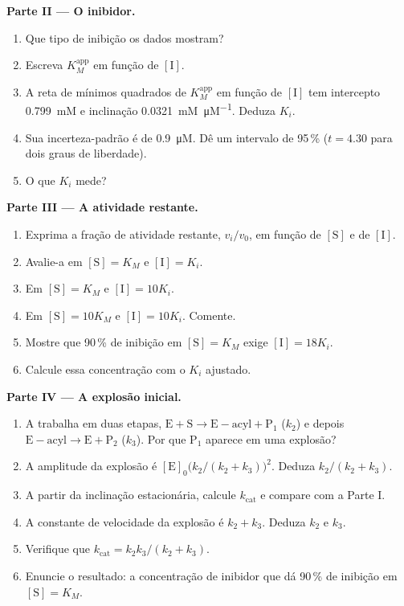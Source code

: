 \begin{problem}
\medskip\noindent\textbf{Parte II --- O inibidor.}
\begin{enumerate}[resume]
  \item Que tipo de inibição os dados mostram?
  \item Escreva $K_M^{\mathrm{app}}$ em função de $[\mathrm I]$.
  \item A reta de mínimos quadrados de $K_M^{\mathrm{app}}$ em função de $[\mathrm I]$ tem intercepto \qty{0.799}{mM} e
        inclinação \qty{0.0321}{mM.\micro M^{-1}}. Deduza $K_i$.
  \item Sua incerteza-padrão é de \qty{0.9}{\micro M}. Dê um intervalo de 95\,\% ($t = 4.30$ para
        dois graus de liberdade).
  \item O que $K_i$ mede?
\end{enumerate}

\medskip\noindent\textbf{Parte III --- A atividade restante.}
\begin{enumerate}[resume]
  \item Exprima a fração de atividade restante, $v_i/v_0$, em função de $[\mathrm S]$ e de
        $[\mathrm I]$.
  \item Avalie-a em $[\mathrm S] = K_M$ e $[\mathrm I] = K_i$.
  \item Em $[\mathrm S] = K_M$ e $[\mathrm I] = 10K_i$.
  \item Em $[\mathrm S] = 10K_M$ e $[\mathrm I] = 10K_i$. Comente.
  \item Mostre que 90\,\% de inibição em $[\mathrm S] = K_M$ exige $[\mathrm I] = 18K_i$.
  \item Calcule essa concentração com o $K_i$ ajustado.
\end{enumerate}

\medskip\noindent\textbf{Parte IV --- A explosão inicial.}
\begin{enumerate}[resume]
  \item A  trabalha em duas etapas, $\mathrm{E + S \to E{-}acyl + P_1}$ ($k_2$) e depois $\mathrm{E{-}acyl \to E +
        P_2}$ ($k_3$). Por que $\mathrm P_1$ aparece em uma explosão?
  \item A amplitude da explosão é $[\mathrm E]_0\bigl(k_2/(k_2 + k_3)\bigr)^2$. Deduza $k_2/(k_2 + k_3)$.
  \item A partir da inclinação estacionária, calcule $k_{\mathrm{cat}}$ e compare com a Parte I.
  \item A constante de velocidade da explosão é $k_2 + k_3$. Deduza $k_2$ e $k_3$.
  \item Verifique que $k_{\mathrm{cat}} = k_2k_3/(k_2 + k_3)$.
  \item Enuncie o resultado: a concentração de inibidor que dá 90\,\% de inibição em
        $[\mathrm S] = K_M$.
\end{enumerate}
\end{problem}
